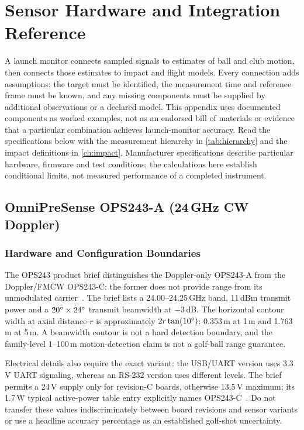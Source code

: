 \chapter[Sensor Hardware and Integration Reference]{Sensor Hardware and Integration\\Reference}
\label{app:hardware}

A launch monitor connects sampled signals to estimates of ball and club motion, then connects those estimates to impact and flight models.
Every connection adds assumptions: the target must be identified, the measurement time and reference frame must be known, and any missing components must be supplied by additional observations or a declared model.
This appendix uses documented components as worked examples, not as an endorsed bill of materials or evidence that a particular combination achieves launch-monitor accuracy.
Read the specifications below with the measurement hierarchy in \cref{tab:hierarchy} and the impact definitions in \cref{ch:impact}.
Manufacturer specifications describe particular hardware, firmware and test conditions; the calculations here establish conditional limits, not measured performance of a completed instrument.

\section{OmniPreSense OPS243-A (24\,GHz CW Doppler)}

\subsection{Hardware and Configuration Boundaries}
The OPS243 product brief distinguishes the Doppler-only OPS243-A from the Doppler/FMCW OPS243-C: the former does not provide range from its unmodulated carrier~\cite{ops243brief}.
The brief lists a 24.00--24.25\,GHz band, 11\,dBm transmit power and a $20\si{\degree}\times24\si{\degree}$ transmit beamwidth at $-3$\,dB.
The horizontal contour width at axial distance $r$ is approximately $2r\tan(10\si{\degree})$: 0.353\,m at 1\,m and 1.763\,m at 5\,m.
A beamwidth contour is not a hard detection boundary, and the family-level 1--100\,m motion-detection claim is not a golf-ball range guarantee.

Electrical details also require the exact variant: the USB/UART version uses 3.3\,V UART signaling, whereas an RS-232 version uses different levels.
The brief permits a 24\,V supply only for revision-C boards, otherwise 13.5\,V maximum; its 1.7\,W typical active-power table entry explicitly names OPS243-C~\cite{ops243brief}.
Do not transfer these values indiscriminately between board revisions and sensor variants or use a headline accuracy percentage as an established golf-shot uncertainty.

